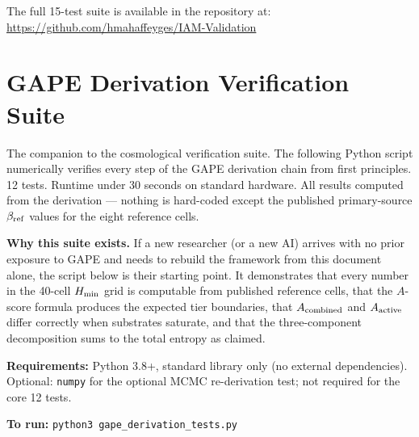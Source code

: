 \documentclass[12pt,a4paper]{article}
\begin{document}
The full 15-test suite is available in the repository at:\\
\url{https://github.com/hmahaffeyges/IAM-Validation}

\newpage
\section{GAPE Derivation Verification Suite}
\label{app:gape_tests}

The companion to the cosmological verification suite. The following Python
script numerically verifies every step of the GAPE derivation chain from
first principles. 12 tests. Runtime under 30 seconds on standard hardware.
All results computed from the derivation --- nothing is hard-coded except
the published primary-source $\beta_{\rm ref}$ values for the eight reference
cells.

\textbf{Why this suite exists.} If a new researcher (or a new AI) arrives with
no prior exposure to GAPE and needs to rebuild the framework from this
document alone, the script below is their starting point. It demonstrates
that every number in the 40-cell $H_{\rm min}$ grid is computable from
published reference cells, that the $A$-score formula produces the expected
tier boundaries, that $A_{\rm combined}$ and $A_{\rm active}$ differ correctly
when substrates saturate, and that the three-component decomposition sums to
the total entropy as claimed.

\textbf{Requirements:} Python 3.8+, standard library only (no external
dependencies). Optional: \texttt{numpy} for the optional MCMC re-derivation
test; not required for the core 12 tests.

\textbf{To run:} \texttt{python3 gape\_derivation\_tests.py}
\end{document}
